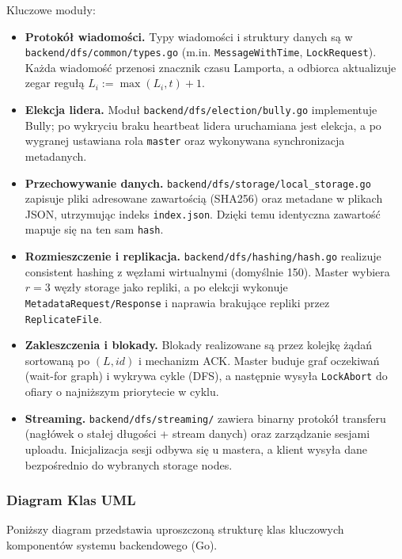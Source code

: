 \documentclass[12pt,a4paper]{article}
\begin{document}
	Kluczowe moduły:
	\begin{itemize}
		\item \textbf{Protokół wiadomości.} Typy wiadomości i struktury danych są w \texttt{backend/dfs/common/types.go} (m.in. \texttt{MessageWithTime}, \texttt{LockRequest}). Każda wiadomość przenosi znacznik czasu Lamporta, a odbiorca aktualizuje zegar regułą $L_i := \max(L_i, t)+1$.

		\item \textbf{Elekcja lidera.} Moduł \texttt{backend/dfs/election/bully.go} implementuje Bully; po wykryciu braku heartbeat lidera uruchamiana jest elekcja, a po wygranej ustawiana rola \texttt{master} oraz wykonywana synchronizacja metadanych.

		\item \textbf{Przechowywanie danych.} \texttt{backend/dfs/storage/local\_storage.go} zapisuje pliki adresowane zawartością (SHA256) oraz metadane w plikach JSON, utrzymując indeks \texttt{index.json}. Dzięki temu identyczna zawartość mapuje się na ten sam \texttt{hash}.
		
		\item \textbf{Rozmieszczenie i replikacja.} \texttt{backend/dfs/hashing/hash.go} realizuje consistent hashing z węzłami wirtualnymi (domyślnie 150). Master wybiera $r=3$ węzły storage jako repliki, a po elekcji wykonuje \texttt{MetadataRequest/Response} i naprawia brakujące repliki przez \texttt{ReplicateFile}.

		\item \textbf{Zakleszczenia i blokady.} Blokady realizowane są przez kolejkę żądań sortowaną po $(L, id)$ i mechanizm ACK. Master buduje graf oczekiwań (wait-for graph) i wykrywa cykle (DFS), a następnie wysyła \texttt{LockAbort} do ofiary o najniższym priorytecie w cyklu.

		\item \textbf{Streaming.} \texttt{backend/dfs/streaming/} zawiera binarny protokół transferu (nagłówek o stałej długości + stream danych) oraz zarządzanie sesjami uploadu. Inicjalizacja sesji odbywa się u mastera, a klient wysyła dane bezpośrednio do wybranych storage nodes.	
	\end{itemize}
	\subsubsection{Diagram Klas UML}
	Poniższy diagram przedstawia uproszczoną strukturę klas kluczowych komponentów systemu backendowego (Go).
	
\end{document}
